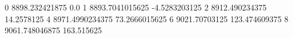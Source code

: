 0 8898.232421875 0.0
1 8893.7041015625 -4.5283203125
2 8912.490234375 14.2578125
4 8971.4990234375 73.2666015625
6 9021.70703125 123.474609375
8 9061.748046875 163.515625
